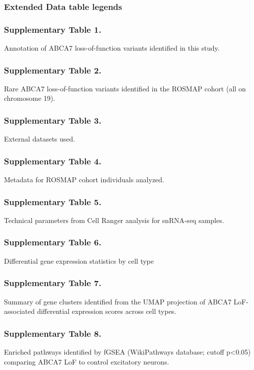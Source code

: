 \subsubsection{Extended Data table legends}
\subsubsection{Supplementary Table 1.} 
Annotation of ABCA7 loss-of-function variants identified in this study.\newline
\subsubsection{Supplementary Table 2.} 
Rare ABCA7 loss-of-function variants identified in the ROSMAP cohort (all on chromosome 19).\newline
\subsubsection{Supplementary Table 3.} 
External datasets used. \newline
\subsubsection{Supplementary Table 4.} 
Metadata for ROSMAP cohort individuals analyzed.\newline
\subsubsection{Supplementary Table 5.} 
Technical parameters from Cell Ranger analysis for snRNA-seq samples.\newline
\subsubsection{Supplementary Table 6.} 
Differential gene expression statistics by cell type \newline
\subsubsection{Supplementary Table 7.} 
Summary of gene clusters identified from the UMAP projection of ABCA7 LoF-associated differential expression scores across cell types.\newline
\subsubsection{Supplementary Table 8.} 
Enriched pathways identified by fGSEA (WikiPathways database; cutoff p<0.05) comparing ABCA7 LoF to control excitatory neurons.\newline
